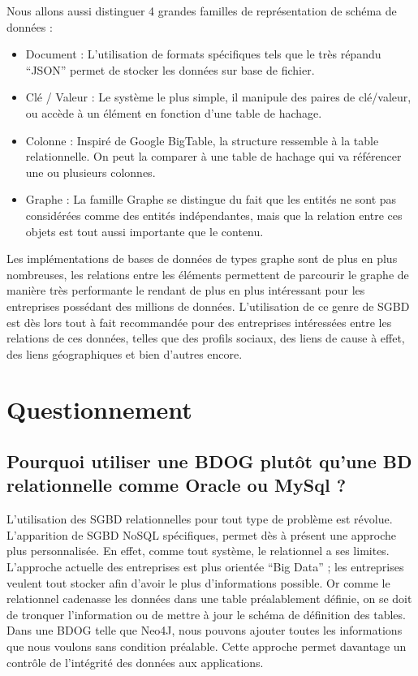 \documentclass[a4paper,fleqn,12pt]{report}
\begin{document}
Nous allons aussi distinguer 4 grandes familles de représentation de schéma de données :

\begin{itemize}
\item Document : L'utilisation de formats spécifiques tels que le très répandu \enquote{JSON} permet de stocker les données sur base de fichier.
\item Clé / Valeur : Le système le plus simple, il manipule des paires de clé/valeur, ou accède à un élément en fonction d'une table de hachage.
\item Colonne : Inspiré de Google BigTable, la structure ressemble à la table relationnelle. On peut la comparer à une table de hachage qui va référencer une ou plusieurs colonnes.
\item Graphe : La famille Graphe se distingue du fait que les entités ne sont pas considérées comme des entités indépendantes, mais que la relation entre ces objets est tout aussi importante que le contenu.
\end{itemize} 

Les implémentations de bases de données de types graphe sont de plus en plus nombreuses, les relations entre les éléments permettent de parcourir le graphe de manière très performante le rendant de plus en plus intéressant pour les entreprises possédant des millions de données. L'utilisation de ce genre de SGBD est dès lors tout à fait recommandée pour des entreprises intéressées entre les relations de ces données, telles que des profils sociaux, des liens de cause à effet, des liens géographiques et bien d’autres encore.\cite{infoqSite}\cite{NoSqlDef}\cite{bruchez2016bases}

\section{Questionnement}

\subsection*{Pourquoi utiliser une BDOG plutôt qu'une BD relationnelle comme Oracle ou MySql ?}

L’utilisation des SGBD relationnelles pour tout type de problème est révolue. L’apparition de SGBD NoSQL spécifiques, permet dès à présent une approche plus personnalisée. En effet, comme tout système, le relationnel a ses limites. L’approche actuelle des entreprises est plus orientée \enquote{Big Data} ; les entreprises veulent tout stocker afin d’avoir le plus d’informations possible. Or comme le relationnel cadenasse les données dans une table préalablement définie, on se doit de tronquer l’information ou de mettre à jour le schéma de définition des tables. Dans une BDOG telle que Neo4J, nous pouvons ajouter toutes les informations que nous voulons sans condition préalable. Cette approche permet davantage un contrôle de l’intégrité des données aux applications.
\end{document}
